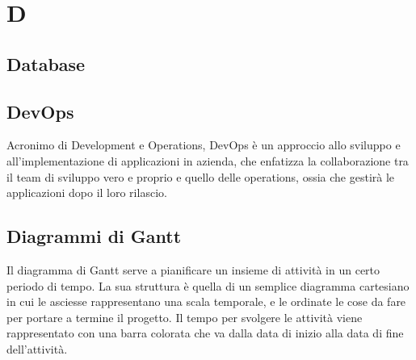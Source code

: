 \section*{D}

\subsection{Database}

\subsection{DevOps}
Acronimo di Development e Operations, DevOps è un approccio allo sviluppo e all’implementazione di applicazioni in azienda, che enfatizza la collaborazione tra il team di sviluppo vero e proprio e quello delle operations, ossia che gestirà le applicazioni dopo il loro rilascio.

\subsection{Diagrammi di Gantt}
Il diagramma di Gantt serve a pianificare un insieme di attività in un certo periodo di tempo. La sua struttura è quella di un semplice diagramma cartesiano in cui le asciesse rappresentano una scala temporale, e le ordinate le cose da fare per portare a termine il progetto. Il tempo per svolgere le attività viene rappresentato con una barra colorata che va dalla data di inizio alla data di fine dell'attività.

